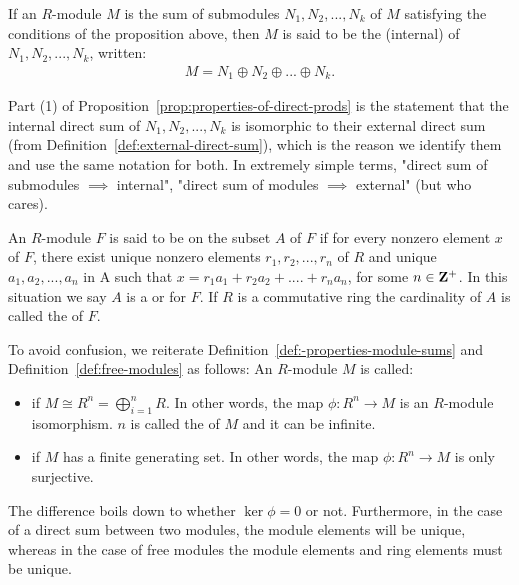     \begin{definition}\label{def:internal-direct-sum}
        If an $R$-module $M$ is the sum of submodules $N_1, N_2, ... , N_k$ of $M$ satisfying the conditions of the proposition above, then $M$ is said to be the (internal)  of $N_1, N_2, ..., N_k$, written:
            \begin{equation*}
            \begin{split}
                M = N_1 \oplus N_2 \oplus ... \oplus N_k.
            \end{split}
            \end{equation*}
    \end{definition}

    \begin{note}
        Part (1) of Proposition~\ref{prop:properties-of-direct-prods} is the statement that the internal direct sum of $N_1,N_2,...,N_k$ is isomorphic to their external direct sum (from Definition~\ref{def:external-direct-sum}), which is the reason we identify them and use the same notation for both. In extremely simple terms, "direct sum of submodules $\implies$ internal", "direct sum of modules $\implies$ external" (but who cares).
    \end{note}

    \begin{definition}\label{def:free-modules}
        An $R$-module $F$ is said to be  on the subset $A$ of $F$ if for every nonzero element $x$ of $F$, there exist unique nonzero elements $r_1,r_2,...,r_n$ of $R$ and unique $a_1,a_2,...,a_n$ in A such that $x = r_1 a_1 + r_2 a_2 + .... + r_n a_n$, for some $n \in \mathbf{Z}^{+}$. In this situation we say $A$ is a  or  for $F$. If $R$ is a commutative ring the cardinality of $A$ is called the  of $F$.
    \end{definition}

    \begin{note}
        To avoid confusion, we reiterate Definition~\ref{def:-properties-module-sums} and Definition~\ref{def:free-modules} as follows: An $R$-module $M$ is called:
        \begin{itemize}
            \item {} if $M \cong R^n = \bigoplus_{i=1}^{n} R$. In other words, the map $\phi:R^n \rightarrow M$ is an $R$-module isomorphism. $n$ is called the  of $M$ and it can be infinite.
            \item {} if $M$ has a finite generating set. In other words, the map $\phi:R^n \rightarrow M$ is only surjective.
        \end{itemize}
        The difference boils down to whether $\ker{\phi}=0$ or not. Furthermore, in the case of a direct sum between two modules, the module elements will be unique, whereas in the case of free modules the module elements and ring elements must be unique.
    \end{note}

